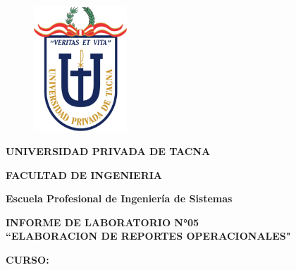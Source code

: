 \documentclass[12pt,letterpaper]{article}
\begin{document}
    \begin{titlepage}
        \begin{center}
            \begin{figure}[htb]
                \begin{center}
                    \includegraphics[width=3.5cm]{./img/logo}
                \end{center}
            \end{figure}
            \vspace*{0.15in}
            \begin{Large}
                \textbf{UNIVERSIDAD PRIVADA DE TACNA}\\
            \end{Large}
            \vspace*{0.15in}
            \begin{Large}
                \textbf{FACULTAD DE INGENIERIA} \\
            \end{Large}
            \vspace*{0.1in}
            \begin{Large}
                \textbf{Escuela Profesional de Ingeniería de Sistemas} \\
            \end{Large}
            \vspace*{0.3in}
            \begin{Large}
                \textbf{INFORME DE LABORATORIO N°05}\\
                \textbf{``ELABORACION DE REPORTES OPERACIONALES"}\\
            \end{Large}
            \vspace*{0.2in}
            \begin{Large}
                \textbf{CURSO:} \\
            \end{Large}
            \vspace*{0.1in}
            \begin{large}

\end{large}
\end{center}
\end{titlepage}
\end{document}
